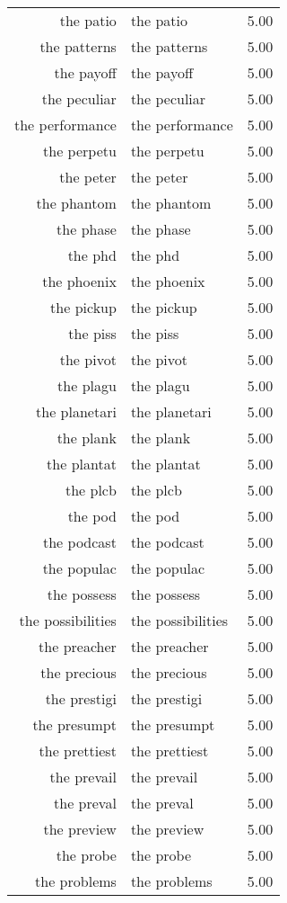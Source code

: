 \begin{table}[ht]
\begin{tabular}{rlr}
  the patio & the patio & 5.00 \\ 
  the patterns & the patterns & 5.00 \\ 
  the payoff & the payoff & 5.00 \\ 
  the peculiar & the peculiar & 5.00 \\ 
  the performance & the performance & 5.00 \\ 
  the perpetu & the perpetu & 5.00 \\ 
  the peter & the peter & 5.00 \\ 
  the phantom & the phantom & 5.00 \\ 
  the phase & the phase & 5.00 \\ 
  the phd & the phd & 5.00 \\ 
  the phoenix & the phoenix & 5.00 \\ 
  the pickup & the pickup & 5.00 \\ 
  the piss & the piss & 5.00 \\ 
  the pivot & the pivot & 5.00 \\ 
  the plagu & the plagu & 5.00 \\ 
  the planetari & the planetari & 5.00 \\ 
  the plank & the plank & 5.00 \\ 
  the plantat & the plantat & 5.00 \\ 
  the plcb & the plcb & 5.00 \\ 
  the pod & the pod & 5.00 \\ 
  the podcast & the podcast & 5.00 \\ 
  the populac & the populac & 5.00 \\ 
  the possess & the possess & 5.00 \\ 
  the possibilities & the possibilities & 5.00 \\ 
  the preacher & the preacher & 5.00 \\ 
  the precious & the precious & 5.00 \\ 
  the prestigi & the prestigi & 5.00 \\ 
  the presumpt & the presumpt & 5.00 \\ 
  the prettiest & the prettiest & 5.00 \\ 
  the prevail & the prevail & 5.00 \\ 
  the preval & the preval & 5.00 \\ 
  the preview & the preview & 5.00 \\ 
  the probe & the probe & 5.00 \\ 
  the problems & the problems & 5.00 \\ 

\end{tabular}
\end{table}
